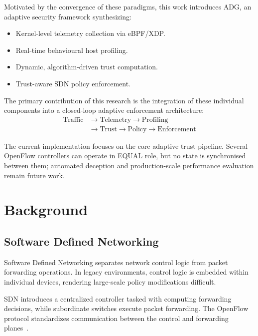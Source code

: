\documentclass[conference]{IEEEtran}
\begin{document}
Motivated by the convergence of these paradigms, this work introduces ADG, an adaptive security framework synthesizing:
\begin{itemize}
\item Kernel-level telemetry collection via eBPF/XDP.
\item Real-time behavioural host profiling.
\item Dynamic, algorithm-driven trust computation.
\item Trust-aware SDN policy enforcement.
\end{itemize}

The primary contribution of this research is the integration of these individual components into a closed-loop adaptive enforcement architecture:
\begin{equation}
\begin{aligned}
\text{Traffic} &\rightarrow \text{Telemetry} \rightarrow \text{Profiling} \\
&\rightarrow \text{Trust} \rightarrow \text{Policy} \rightarrow \text{Enforcement}
\end{aligned}
\end{equation}

The current implementation focuses on the core adaptive trust pipeline. Several OpenFlow controllers can operate in EQUAL role, but no state is synchronised between them; automated deception and production-scale performance evaluation remain future work.


\section{Background}

\subsection{Software Defined Networking}
Software Defined Networking separates network control logic from packet forwarding operations. In legacy environments, control logic is embedded within individual devices, rendering large-scale policy modifications difficult. 

SDN introduces a centralized controller tasked with computing forwarding decisions, while subordinate switches execute packet forwarding. The OpenFlow protocol standardizes communication between the control and forwarding planes~\cite{mckeown2008openflow}. 
\end{document}
